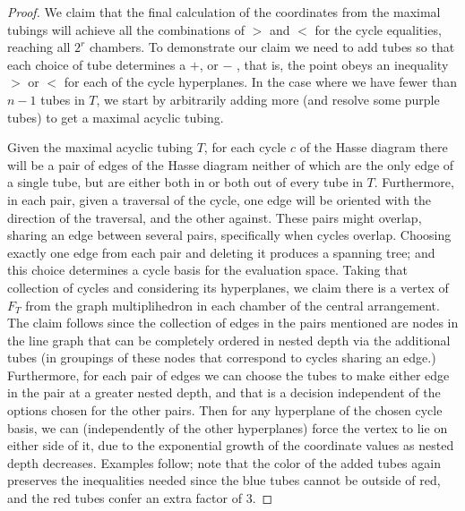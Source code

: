 \documentclass[10pt,a4paper]{amsart}
\begin{document}
\begin{proof}
We claim that the final calculation of the coordinates from the maximal tubings will achieve all the combinations of $>$ and $<$ for the cycle equalities, reaching all $2^r$ chambers. To demonstrate our claim we need to add  tubes so that each choice of tube determines a $+$, or  $-$ , that is, the point obeys an inequality $>$ or $<$  for each of the cycle hyperplanes.   In the case where we have fewer than $n-1$ tubes in $T$, we start by arbitrarily adding more (and resolve some purple tubes) to get a maximal acyclic tubing.

 Given the maximal acyclic tubing $T$,  for each cycle $c$ of the Hasse diagram there will be a pair of edges of the Hasse diagram neither of which are the only edge of a single tube, but are either both in or both out of every tube in $T.$ Furthermore, in each pair, given a traversal of the cycle, one edge will be oriented with the direction of the traversal, and the other against. These pairs might overlap, sharing an edge between several pairs, specifically when cycles overlap. Choosing exactly one edge from each pair and deleting it produces a spanning tree; and this choice determines a cycle basis for the evaluation space. Taking that collection of cycles and considering its hyperplanes, we claim there is a vertex of $F_T$ from the graph multiplihedron in each chamber of the central arrangement. The claim follows since the collection of edges in the pairs mentioned are nodes in the line graph that can be completely ordered in nested depth via the additional tubes (in groupings of these nodes that correspond to cycles sharing an edge.) Furthermore, for each pair of edges we can choose the tubes to make either edge in the pair at a greater nested depth, and that is a decision independent of the options chosen for the other pairs.  Then for any hyperplane of the chosen cycle basis, we can (independently of the other hyperplanes) force the vertex to lie on either side of it, due to the exponential growth of the coordinate values as nested depth decreases. Examples follow; note that the color of the added tubes again preserves the inequalities needed since the blue tubes cannot be outside of red, and the red tubes confer an extra factor of 3. 
   \end{proof}  
\end{document}
